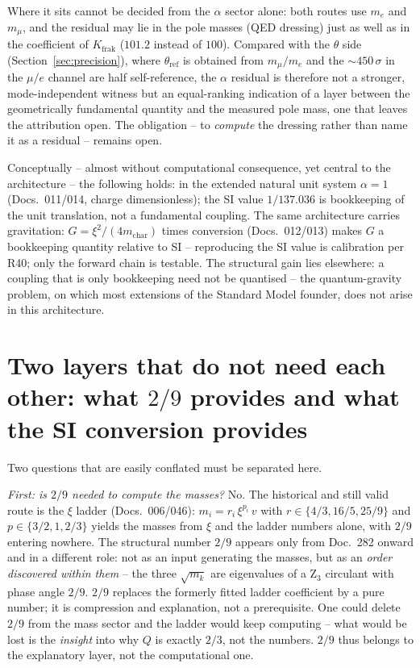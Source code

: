 Where it sits cannot be decided from the $\alpha$ sector alone: both routes
use $m_e$ and $m_\mu$, and the residual may lie in the pole masses (QED
dressing) just as well as in the coefficient of $K_{\text{frak}}$ ($101.2$
instead of $100$). Compared with the $\theta$ side
(Section~\ref{sec:precision}), where $\theta_{\text{ref}}$ is obtained from
$m_\mu/m_e$ and the $\sim450\,\sigma$ in the $\mu/e$ channel are half
self-reference, the $\alpha$ residual is therefore not a stronger,
mode-independent witness but an equal-ranking indication of a layer between
the geometrically fundamental quantity and the measured pole mass, one that
leaves the attribution open. The obligation -- to \emph{compute} the dressing
rather than name it as a residual -- remains open.

Conceptually -- almost without computational consequence, yet central to
the architecture -- the following holds: in the extended natural unit
system $\alpha=1$ (Docs.~011/014, charge dimensionless); the SI value
$1/137.036$ is bookkeeping of the unit translation, not a fundamental
coupling. The same architecture carries gravitation:
$G=\xi^2/(4 m_{\text{char}})$ times conversion (Docs.~012/013) makes $G$
a bookkeeping quantity relative to SI -- reproducing the SI value is
calibration per R40; only the forward chain is testable. The structural
gain lies elsewhere: a coupling that is only bookkeeping need not be
quantised -- the quantum-gravity problem, on which most extensions of the
Standard Model founder, does not arise in this architecture.

\section{Two layers that do not need each other: what $2/9$ provides and what the SI conversion provides}
Two questions that are easily conflated must be separated here.

\emph{First: is $2/9$ needed to compute the masses?} No. The historical and
still valid route is the $\xi$ ladder (Docs.~006/046): $m_i=r_i\,\xi^{p_i}\,v$
with $r\in\{4/3,16/5,25/9\}$ and $p\in\{3/2,1,2/3\}$ yields the masses from
$\xi$ and the ladder numbers alone, with $2/9$ entering nowhere. The
structural number $2/9$ appears only from Doc.~282 onward and in a different
role: not as an input generating the masses, but as an \emph{order
discovered within them} -- the three $\sqrt{m_k}$ are eigenvalues of a
Z$_3$ circulant with phase angle $2/9$. $2/9$ replaces the formerly fitted
ladder coefficient by a pure number; it is compression and explanation, not
a prerequisite. One could delete $2/9$ from the mass sector and the ladder
would keep computing -- what would be lost is the \emph{insight} into why
$Q$ is exactly $2/3$, not the numbers. $2/9$ thus belongs to the
explanatory layer, not the computational one.

